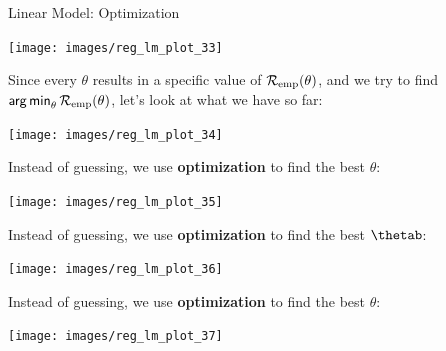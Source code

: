 \documentclass[11pt,compress,t,notes=noshow, xcolor=table]{beamer}
\newenvironment{knitrout}{}{} %
\begin{document}
\begin{vbframe}{Linear Model: Optimization}
\begin{knitrout}
{\centering \texttt{[image: images/reg\_lm\_plot\_33]} 

}



\end{knitrout}


\framebreak


Since every $\theta$ results in a specific value of $\mathcal{R}_{\text{emp}}(\theta)$, and we try
to find $\mathop{\sf arg\,min}_{\theta} \mathcal{R}_{\text{emp}}(\theta)$, let's look at what we have so far:

\lz

\begin{knitrout}\scriptsize
{}\color{fgcolor}

{\centering \texttt{[image: images/reg\_lm\_plot\_34]} 

}



\end{knitrout}

\framebreak

Instead of guessing, we use \textbf{optimization} to find the best $\theta$:
\begin{knitrout}\scriptsize
{}\color{fgcolor}

{\centering \texttt{[image: images/reg\_lm\_plot\_35]} 

}



\end{knitrout}

\framebreak

Instead of guessing, we use \textbf{optimization} to find the best $\thetab$:
\begin{knitrout}\scriptsize
{}\color{fgcolor}

{\centering \texttt{[image: images/reg\_lm\_plot\_36]} 

}



\end{knitrout}

\framebreak

Instead of guessing, we use \textbf{optimization} to find the best $\theta$:

\begin{knitrout}\scriptsize
{}\color{fgcolor}

{\centering \texttt{[image: images/reg\_lm\_plot\_37]} 

}
\end{knitrout}
\end{vbframe}
\end{document}
